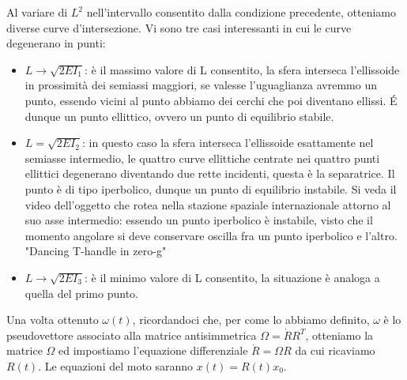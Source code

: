 \documentclass[
10pt, %
a4paper, %
oneside, %
headinclude,footinclude, %
BCOR5mm, %
]{scrartcl}
\begin{document}
Al variare di \(L^2\) nell'intervallo consentito dalla condizione precedente, otteniamo diverse curve d'intersezione. Vi sono tre casi interessanti in cui le curve degenerano in punti:
\begin{itemize}
	\item \(L \rightarrow \sqrt{2EI_1}\): è il massimo valore di L consentito, la sfera interseca l'ellissoide in prossimità dei semiassi maggiori, se valesse l'uguaglianza avremmo un punto, essendo vicini al punto abbiamo dei cerchi che poi diventano ellissi. \'E dunque un punto ellittico, ovvero un punto di equilibrio stabile.
	\item \(L = \sqrt{2EI_2}\): in questo caso la sfera interseca l'ellissoide esattamente nel semiasse intermedio, le quattro curve ellittiche centrate nei quattro punti ellittici degenerano diventando due rette incidenti, questa è la separatrice. Il punto è di tipo iperbolico, dunque un punto di equilibrio instabile. Si veda il video dell'oggetto che rotea nella stazione spaziale internazionale attorno al suo asse intermedio: essendo un punto iperbolico è instabile, visto che il momento angolare si deve conservare oscilla fra un punto iperbolico e l'altro.\\ "Dancing T-handle in zero-g"
	\item \(L \rightarrow \sqrt{2EI_3}\): è il minimo valore di L consentito, la situazione è analoga a quella del primo punto.
\end{itemize}
Una volta ottenuto $\omega(t)$, ricordandoci che, per come lo abbiamo definito, $\omega$ è lo pseudovettore associato alla matrice antisimmetrica \(\Omega= \dot{R}R^T\), otteniamo la matrice $\Omega$ ed impostiamo l'equazione differenziale \(\dot{R} = \Omega R\) da cui ricaviamo \(R(t)\). Le equazioni del moto saranno \(x(t) = R(t)x_0\).
\end{document}
